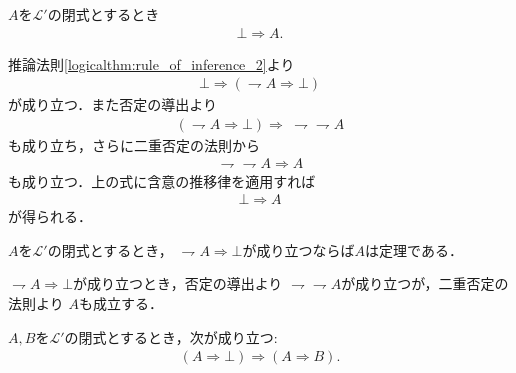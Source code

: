 	\begin{screen}
		\begin{logicalthm}[矛盾からはあらゆる式が導かれる]\label{logicalthm:contradiction_derives_any_formula}
			$A$を$\mathcal{L}'$の閉式とするとき
			\begin{align}
				\bot \Longrightarrow A.
			\end{align}
		\end{logicalthm}
	\end{screen}
	
	\begin{prf}
		推論法則\ref{logicalthm:rule_of_inference_2}より
		\begin{align}
			\bot \Longrightarrow (\rightharpoondown A \Longrightarrow \bot)
		\end{align}
		が成り立つ．また否定の導出より
		\begin{align}
			(\rightharpoondown A \Longrightarrow \bot) \Longrightarrow\ \rightharpoondown \rightharpoondown A
		\end{align}
		も成り立ち，さらに二重否定の法則から
		\begin{align}
			\rightharpoondown \rightharpoondown A \Longrightarrow A
		\end{align}
		も成り立つ．上の式に含意の推移律を適用すれば
		\begin{align}
			\bot \Longrightarrow A
		\end{align}
		が得られる．
		\QED
	\end{prf}
	
	\begin{screen}
		\begin{logicalthm}[背理法の原理]
			$A$を$\mathcal{L}'$の閉式とするとき，
			$\rightharpoondown A \Longrightarrow \bot$が成り立つならば$A$は定理である．
		\end{logicalthm}
	\end{screen}
	
	\begin{prf}
		$\rightharpoondown A \Longrightarrow \bot$が成り立つとき，否定の導出より
		$\rightharpoondown \rightharpoondown A$が成り立つが，二重否定の法則より
		$A$も成立する．
		\QED
	\end{prf}
	
	\begin{screen}
		\begin{logicalthm}[矛盾を導く式はあらゆる式を導く]\label{logicalthm:formula_leading_to_contradiction_derives_any_formula}
			$A,B$を$\mathcal{L}'$の閉式とするとき，次が成り立つ:
			\begin{align}
				(A \Longrightarrow \bot) \Longrightarrow (A \Longrightarrow B).
			\end{align}
		\end{logicalthm}
	\end{screen}
	
